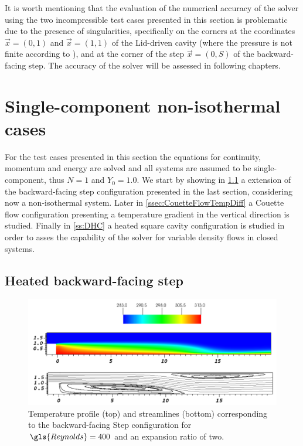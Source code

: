 It is worth mentioning that the evaluation of the numerical accuracy of the solver using the two incompressible test cases presented in this section is problematic due to the presence of singularities, specifically on the corners at the coordinates $ \vec{x} = (0,1)$ and $\vec{x} =(1,1)$ of the Lid-driven cavity (where the pressure is not finite according to \cite{botellaBenchmarkSpectralResults1998}), and at the corner of the step $\vec{x} = (0,S)$ of the backward-facing step. The accuracy of the solver will be assessed in following chapters. 


\section{Single-component non-isothermal cases} \label{sec:SinCompNonIsothermCase}
For the test cases presented in this section the equations for continuity, momentum and energy are solved and all systems are assumed to be single-component, thus $N = 1$ and $Y_0 = 1.0$. We start by showing in \cref{ssec:HeatedBackwardFacingStep} a extension of the backward-facing step configuration presented in the last section, considering now a non-isothermal system. Later in \cref{ssec:CouetteFlowTempDiff} a Couette flow configuration presenting a temperature gradient in the vertical direction is studied. Finally in \cref{ss:DHC} a heated square cavity configuration is studied in order to asses the capability of the solver for variable density flows in closed systems. 


\subsection{Heated backward-facing step}\label{ssec:HeatedBackwardFacingStep}
\begin{figure}[tb]
	\begin{center}
		\includegraphics[width=\linewidth]{../plots/HBFS_TemperatureRe700_2.pdf}
		\caption{Temperature profile (top) and streamlines (bottom) corresponding to the backward-facing Step configuration for $\gls{Reynolds} = 400$ and an expansion ratio of two.}
		\label{BFS_Streamlines}
	\end{center}	
\end{figure} 

